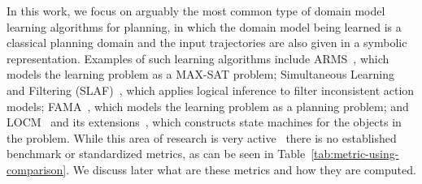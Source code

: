 \documentclass{article}
\theoremstyle{definition}
\theoremstyle{remark}
\newif\ifaddcomments
\newcommand{\roni}[1]{\ifaddcomments{\textcolor{red}{[Roni: #1]}}\fi}
\newcommand{\yarin}[1]{\ifaddcomments{\textcolor{teal}{[Yarin: #1]}}\fi}
\begin{document}
In this work, we focus on arguably the most common type of domain model learning algorithms for planning, in which the domain model being learned is a classical planning domain and the input trajectories are also given in a symbolic representation. 
Examples of such learning algorithms include ARMS~\citep{yang2007learning}, which models the learning problem as a MAX-SAT problem; Simultaneous Learning and Filtering (SLAF)~\citep{amir2008learning}, which applies logical inference to filter inconsistent action models; FAMA~\citep{aineto2019learning}, which models the learning problem as a planning problem; 
and LOCM~\citep{cresswell2011generalised} and its extensions~\citep{cresswell2013acquiring,gregory2016domain}, which constructs state machines for the objects in the problem. 
While this area of research is very active~\citep{juba2021safe,mordoch2023safe,xi2024neuro,Lamanna24,LAMANNA2025104256} there is no established benchmark or standardized metrics, as can be seen in Table~\ref{tab:metric-using-comparison}. We discuss later what are these metrics and how they are computed. 







\end{document}
